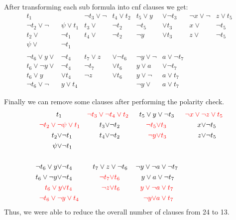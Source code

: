 \documentclass{base}
\begin{document}
After transforming each sub formula into cnf clauses we get:
\begin{align*}
t_{1}&   &  \neg t_{3}\lor \neg &t_{4}\lor t_{2} &  t_{5}\lor y &\lor\neg t_{3} & \neg x\lor \neg &z\lor t_{5}\\
\neg t_{2}\lor  \neg &\psi \lor t_{1}   &  t_{3}\lor &\neg t_{2}   & \neg t_{5}&\lor t_{3} & x\lor &\neg t_{5}\\
t_{2}\lor &\neg t_{1}   &  t_{4}\lor &\neg t_{2} &  \neg y&\lor t_{3} & z\lor &\neg t_{5}\\
\psi \lor &\neg t_{1}\\
\\
\neg t_{6}\lor y \lor & \neg t_{4} & t_{7}\lor z& \lor \neg t_{6} & \neg y \lor \neg &a \lor \neg t_{7}\\
t_{6}\lor \neg y\lor &\neg t_{4} & \neg t_{7}&\lor t_{6} & y \lor a &\lor \neg t_{7}\\
t_{6}\lor y& \lor t_{4} & \neg z&\lor t_{6} & y \lor \neg &a \lor t_{7}\\
\neg t_{6}\lor \neg &y \lor t_{4} &    &     & \neg y \lor  &a \lor t_{7}
\end{align*}

Finally we can remove some clauses after performing the polarity check.
\begin{align*}
t_{1}&   &  \textcolor{red}{\neg t_{3}\lor \neg} &\textcolor{red}{t_{4}\lor t_{2}} &  t_{5}\lor y &\lor\neg t_{3} & \textcolor{red}{\neg x\lor \neg }&\textcolor{red}{z\lor t_{5}}\\
\textcolor{red}{\neg t_{2}\lor  \neg }&\textcolor{red}{\psi \lor t_{1}}   &  t_{3}\lor &\neg t_{2}   & \textcolor{red}{\neg t_{5}}&\textcolor{red}{\lor t_{3}} & x\lor &\neg t_{5}\\
t_{2}\lor &\neg t_{1}   &  t_{4}\lor &\neg t_{2} &  \textcolor{red}{\neg y}&\textcolor{red}{\lor t_{3}} & z\lor &\neg t_{5}\\
\psi \lor &\neg t_{1}\\
\\
\neg t_{6}\lor y\lor & \neg t_{4} & t_{7}\lor z& \lor \neg t_{6} & \neg y \lor \neg &a \lor \neg t_{7}\\
t_{6}\lor \neg y\lor& \neg t_{4} & \textcolor{red}{\neg t_{7}}&\textcolor{red}{\lor t_{6}} & y \lor a &\lor \neg t_{7}\\
\textcolor{red}{t_{6}\lor y}& \textcolor{red}{\lor t_{4}} & \textcolor{red}{\neg z}&\textcolor{red}{\lor t_{6}} & \textcolor{red}{y \lor \neg} &\textcolor{red}{a \lor t_{7}}\\
\textcolor{red}{\neg t_{6}\lor \neg} &\textcolor{red}{y \lor t_{4}} &    &     & \textcolor{red}{\neg y \lor}  &\textcolor{red}{a \lor t_{7}}
\end{align*}
Thus, we were able to reduce the overall number of clauses from 24 to 13.
\end{document}

